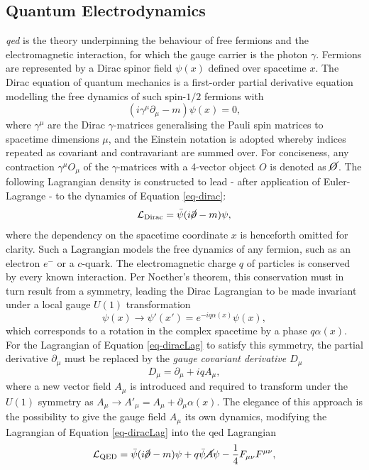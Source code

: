 \subsection{Quantum Electrodynamics}\label{subsec-QED}
\textit{\gls{qed}} is the theory underpinning the behaviour of free fermions and the electromagnetic interaction, for which the gauge carrier is the photon $\gamma$. Fermions are represented by a Dirac spinor field $\psi(x)$ defined over spacetime $x$. The Dirac equation of quantum mechanics is a first-order partial derivative equation modelling the free dynamics of such spin-$1/2$ fermions with
\begin{equation}\label{eq-dirac}
    (i\gamma^{\mu} \partial_{\mu} - m) \psi(x) = 0,
\end{equation}
where $\gamma^{\mu}$ are the Dirac $\gamma$-matrices generalising the Pauli spin matrices to spacetime dimensions $\mu$, and the Einstein notation is adopted whereby indices repeated as covariant and contravariant are summed over. For conciseness, any contraction $\gamma^{\mu} O_{\mu}$ of the $\gamma$-matrices with a 4-vector object $O$ is denoted as $\cancel{O}$. The following Lagrangian density is constructed to lead - after application of Euler-Lagrange - to the dynamics of Equation \ref{eq-dirac}:
\begin{equation}\label{eq-diracLag}
   \mathcal{L}_{\text{Dirac}} = \bar{\psi} (i \cancel{\partial}- m) \psi,
\end{equation}
where the dependency on the spacetime coordinate $x$ is henceforth omitted for clarity. Such a Lagrangian models the free dynamics of any fermion, such as an electron $e^-$ or a $c$-quark. The electromagnetic charge $q$ of particles is conserved by every known interaction. Per Noether's theorem, this conservation must in turn result from a symmetry, leading the Dirac Lagrangian to be made invariant under a local gauge $U(1)$ transformation
\begin{equation}\label{eq-GaugeU1}
    \psi(x) \rightarrow \psi'(x') = e^{-iq\alpha(x)} \psi(x),
\end{equation}
which corresponds to a rotation in the complex spacetime by a phase $q\alpha(x)$. For the Lagrangian of Equation \ref{eq-diracLag} to satisfy this symmetry, the partial derivative $\partial_{\mu}$ must be replaced by the \textit{gauge covariant derivative $D_{\mu}$}
\begin{equation}\label{eq-CoDerU1}
    D_{\mu} = \partial_{\mu} + iqA_{\mu},
\end{equation}
where a new vector field $A_{\mu}$ is introduced and required to transform under the $U(1)$ symmetry as $A_{\mu} \rightarrow A'_{\mu} = A_{\mu} + \partial_{\mu} \alpha(x)$. The elegance of this approach is the possibility to give the gauge field $A_{\mu}$ its own dynamics, modifying the Lagrangian of Equation \ref{eq-diracLag} into the \gls{qed} Lagrangian \[ \mathcal{L}_{\text{QED}} = \bar{\psi} (i \cancel{\partial}- m) \psi + q \bar{\psi} \cancel{A} \psi - \frac{1}{4} F_{\mu\nu} F^{\mu\nu}, \]
